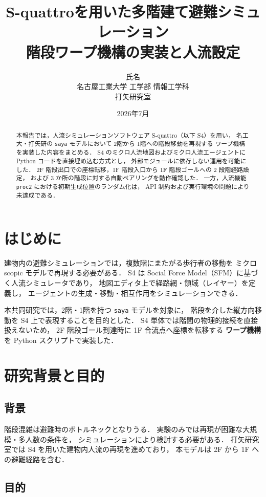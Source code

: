 \documentclass[11pt,a4paper]{ltjsarticle}
\title{S-quattroを用いた多階建て避難シミュレーション\\
  階段ワープ機構の実装と人流設定}
\author{%
  氏名 \\
  名古屋工業大学 工学部 情報工学科 \\
  打矢研究室
}
\date{2026年7月}
\begin{document}
\maketitle

\begin{abstract}
本報告では，人流シミュレーションソフトウェア S-quattro（以下 S4）を用い，
名工大・打矢研の \texttt{saya} モデルにおいて 2階から 1階への階段移動を再現する
ワープ機構を実装した内容をまとめる．
S4 のミクロ人流地図およびミクロ人流エージェントに Python コードを直接埋め込む方式とし，
外部モジュールに依存しない運用を可能にした．
2F 階段出口での座標転移，1F 階段入口から 1F 階段ゴールへの 2 段階経路設定，
および 3 か所の階段に対する自動ペアリングを動作確認した．
一方，人流機能 \texttt{proc2} における初期生成位置のランダム化は，
API 制約および実行環境の問題により未達成である．
\end{abstract}

\section{はじめに}

建物内の避難シミュレーションでは，複数階にまたがる歩行者の移動を
ミクロscopic モデルで再現する必要がある．
S4 は Social Force Model（SFM）に基づく人流シミュレータであり，
地図エディタ上で経路網・領域（レイヤー）を定義し，
エージェントの生成・移動・相互作用をシミュレーションできる．

本共同研究では，2階・1階を持つ \texttt{saya} モデルを対象に，
階段を介した縦方向移動を S4 上で表現することを目的とした．
S4 単体では階間の物理的接続を直接扱えないため，
2F 階段ゴール到達時に 1F 合流点へ座標を転移する
\textbf{ワープ機構}を Python スクリプトで実装した．

\section{研究背景と目的}

\subsection{背景}

階段混雑は避難時のボトルネックとなりうる．
実験のみでは再現が困難な大規模・多人数の条件を，
シミュレーションにより検討する必要がある．
打矢研究室では S4 を用いた建物内人流の再現を進めており，
本モデルは 2F から 1F への避難経路を含む．

\subsection{目的}
\end{document}
